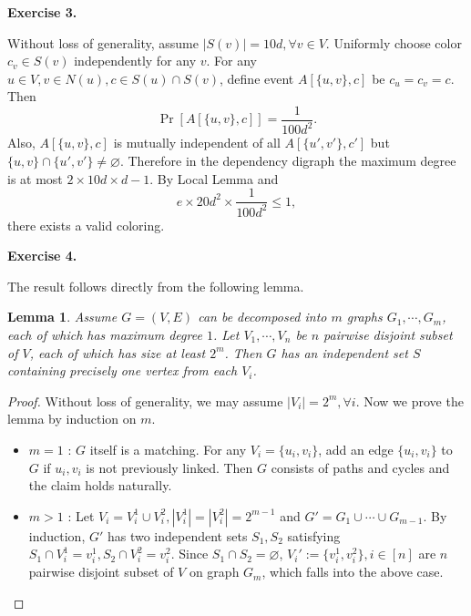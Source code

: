 \documentclass[a4paper]{article}
\newtheorem{lemma}{Lemma}
\newtheorem*{proof}{Proof}
\newenvironment{exercise}[1]{
	\par
	\noindent\textbf{Exercise #1.}\quad
}{
	\par
	\bigskip
}
\newcommand{\sbra}[1]{\left[ #1 \right]}
\begin{document}
\begin{exercise}{3}
    Without loss of generality, assume $|S(v)|=10d,\forall v\in V$. Uniformly choose color $c_v\in S(v)$ independently
    for any $v$. For any $u\in V,v\in N(u),c\in S(u)\cap S(v)$, define event $A[\{u,v\},c]$ be $c_u=c_v=c$. Then
    $$
    \Pr\sbra{A[\{u,v\},c]}=\frac1{100d^2}.
    $$
    Also, $A[\{u,v\},c]$ is mutually independent of all $A[\{u',v'\},c']$ but $\{u,v\}\cap\{u',v'\}\neq\varnothing$. 
    Therefore in the dependency digraph the maximum degree is at most $2\times10d\times d-1$.
    By Local Lemma and 
    $$
    e\times20d^2\times\frac1{100d^2}\leq1,
    $$
    there exists a valid coloring.
\end{exercise}

\begin{exercise}{4}
    The result follows directly from the following lemma.
    \begin{lemma}
        Assume $G=(V,E)$ can be decomposed into $m$ graphs $G_1,\cdots,G_m$, each of which has maximum degree $1$.
        Let $V_1,\cdots,V_n$ be $n$ pairwise disjoint subset of $V$, each of which has size at least $2^m$.
        Then $G$ has an independent set $S$ containing precisely one vertex from each $V_i$.
    \end{lemma}
    \begin{proof}
        Without loss of generality, we may assume $|V_i|=2^m,\forall i$.
        Now we prove the lemma by induction on $m$.
        \begin{itemize}
            \item $m=1$ : $G$ itself is a matching. For any $V_i=\{u_i,v_i\}$, add an edge $\{u_i,v_i\}$ to $G$ if $u_i,v_i$
                is not previously linked. Then $G$ consists of paths and cycles and the claim holds naturally.
            \item $m>1$ : Let $V_i=V_i^1\cup V_i^2,|V_i^1|=|V_i^2|=2^{m-1}$ and $G'=G_1\cup\cdots\cup G_{m-1}$.
                By induction, $G'$ has two independent sets $S_1,S_2$ satisfying $S_1\cap V_i^1=v_i^1,S_2\cap V_i^2=v_i^2$.
                Since $S_1\cap S_2=\varnothing$, $V_i':=\{v_i^1,v_i^2\},i\in[n]$ are $n$ pairwise disjoint subset of $V$ on
                graph $G_m$, which falls into the above case.
        \end{itemize}
    \end{proof}
\end{exercise}
\end{document}
